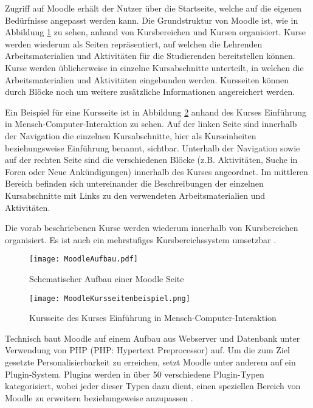 Zugriff auf Moodle erhält der Nutzer über die Startseite, welche auf die eigenen Bedürfnisse angepasst werden kann. Die Grundstruktur von Moodle ist, wie in Abbildung \ref{fig:MoodleAufbau} zu sehen, anhand von Kursbereichen und Kursen organisiert. Kurse werden wiederum als Seiten repräsentiert, auf welchen die Lehrenden Arbeitsmaterialien und Aktivitäten für die Studierenden bereitstellen können. Kurse werden üblicherweise in einzelne Kursabschnitte unterteilt, in welchen die Arbeitsmaterialien und Aktivitäten eingebunden werden. Kursseiten können durch Blöcke noch um weitere zusätzliche Informationen angereichert werden.

Ein Beispiel für eine Kursseite ist in Abbildung \ref{fig:MoodleKursseitenbeispiel} anhand des Kurses \glqq Einführung in Mensch-Computer-Interaktion\grqq{} zu sehen. Auf der linken Seite sind innerhalb der Navigation die einzelnen Kursabschnitte, hier als Kurseinheiten beziehungsweise Einführung  benannt, sichtbar. Unterhalb der Navigation sowie auf der rechten Seite sind die verschiedenen Blöcke (z.B. \glqq Aktivitäten\grqq{}, \glqq Suche in Foren\grqq{} oder \glqq Neue Ankündigungen\grqq{}) innerhalb des Kurses angeordnet. Im mittleren Bereich befinden sich untereinander die Beschreibungen der einzelnen Kursabschnitte mit Links zu den verwendeten Arbeitsmaterialien und Aktivitäten.

Die vorab beschriebenen Kurse werden wiederum innerhalb von Kursbereichen organisiert. Es ist auch ein mehrstufiges Kursbereichssystem umsetzbar \citep{moodle2015aufbau}.

\begin{figure}[h!]
\texttt{[image: MoodleAufbau.pdf]}
\caption{\label{fig:MoodleAufbau}Schematischer Aufbau einer Moodle Seite}
\end{figure}

\begin{figure}[h!]
\texttt{[image: MoodleKursseitenbeispiel.png]}
\caption{\label{fig:MoodleKursseitenbeispiel}Kursseite des Kurses \glqq Einführung in Mensch-Computer-Interaktion\grqq{} \citep{fernuniversitaet2018mensch}}
\end{figure}

Technisch baut Moodle auf einem Aufbau aus Webserver und Datenbank unter Verwendung von PHP (PHP: Hypertext Preprocessor) auf. Um die zum Ziel gesetzte Personalisierbarkeit zu erreichen, setzt Moodle unter anderem auf ein Plugin-System. Plugins werden in über 50 verschiedene Plugin-Typen kategorisiert, wobei jeder dieser Typen dazu dient, einen speziellen Bereich von Moodle zu erweitern beziehungsweise anzupassen \citep{moodle2017plugin}.


